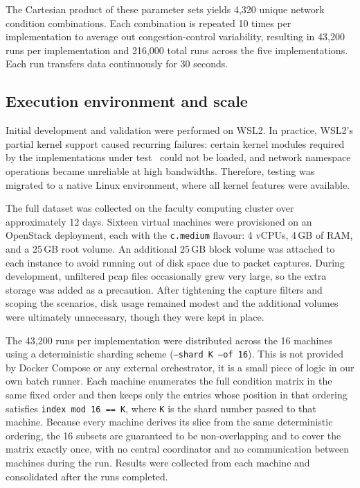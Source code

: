 The Cartesian product of these parameter sets yields 4,320 unique network condition combinations.
Each combination is repeated 10 times per implementation to average out
congestion-control variability, resulting in 43,200 runs per implementation
and 216,000 total runs across the five implementations. Each run transfers data
continuously for 30 seconds.

\subsection{Execution environment and scale}
\label{subsec:execution}

Initial development and validation were performed on WSL2. In practice,
WSL2's partial kernel support caused recurring failures: certain kernel
modules required by the implementations under test~\cite{cloudflare-quiche}
could not be loaded, and network namespace operations became unreliable at
high bandwidths. Therefore, testing was migrated to a native Linux environment,
where all kernel features were available.

The full dataset was collected on the faculty computing cluster over
approximately 12 days. Sixteen virtual machines were provisioned on an
OpenStack deployment, each with the \texttt{c.medium} flavour: 4 vCPUs,
4\,GB of RAM, and a 25\,GB root volume. An additional 25\,GB block volume
was attached to each instance to avoid running out of disk space due to packet
captures. During development, unfiltered pcap files occasionally grew
very large, so the extra storage was added as a precaution. After
tightening the capture filters and scoping the scenarios, disk usage
remained modest and the additional volumes were ultimately unnecessary,
though they were kept in place.

The 43,200 runs per implementation were distributed across the 16 machines
using a deterministic sharding scheme (\texttt{--shard K --of 16}). This is not
provided by Docker Compose or any external orchestrator, it is a small piece of
logic in our own batch runner. Each machine enumerates the full condition matrix
in the same fixed order and then keeps only the entries whose position in that
ordering satisfies \texttt{index mod 16 == K}, where \texttt{K} is the shard
number passed to that machine. Because every machine derives its slice from the
same deterministic ordering, the 16 subsets are guaranteed to be
non-overlapping and to cover the matrix exactly once, with no central
coordinator and no communication between machines during the run. Results were
collected from each machine and consolidated after the runs completed.

